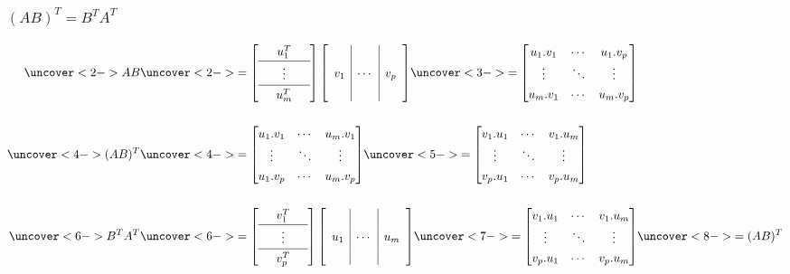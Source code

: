 \documentclass[9pt]{beamer}
\begin{document}
\begin{frame}[t]
 \frametitle{$(AB)^T=B^TA^T$}
 
 \begin{align*}
   \uc<2->{AB} &\uc<2->{=\renewcommand{\arraystretch}{1.3}
         \left[\begin{array}{ccc}
          & u_1^T & \\ \hline
          & \vdots & \\ \hline 
          & u_m^T & 
         \end{array}\right]
         \left[\begin{array}{c|c|c}
          && \\ v_1 & \dotsb & v_p \\ &&
         \end{array}\right]}\uc<3->{ 
       = \bbm
           u_1.v_1 & \cdots & u_1.v_p \\
           \vdots  & \ddots & \vdots \\
           u_m.v_1 & \cdots & u_m.v_p 
         \ebm} \\[3ex]
   \uc<4->{(AB)^T} &\uc<4->{= 
         \bbm
           u_1.v_1 & \cdots & u_m.v_1 \\
           \vdots  & \ddots & \vdots \\
           u_1.v_p & \cdots & u_m.v_p 
         \ebm}\uc<5->{ = 
         \bbm
           v_1.u_1 & \cdots & v_1.u_m \\
           \vdots  & \ddots & \vdots \\
           v_p.u_1 & \cdots & v_p.u_m 
         \ebm} \\[3ex]
   \uc<6->{B^TA^T} &\uc<6->{=\renewcommand{\arraystretch}{1.3}
         \left[\begin{array}{ccc}
          & v_1^T & \\ \hline
          & \vdots & \\ \hline 
          & v_p^T & 
         \end{array}\right]
         \left[\begin{array}{c|c|c}
          && \\ u_1 & \dotsb & u_m \\ &&
         \end{array}\right]}\uc<7->{ =
         \bbm
           v_1.u_1 & \cdots & v_1.u_m \\
           \vdots  & \ddots & \vdots \\
           v_p.u_1 & \cdots & v_p.u_m 
         \ebm}\uc<8->{ = (AB)^T}
 \end{align*}
\end{frame}
\end{document}
